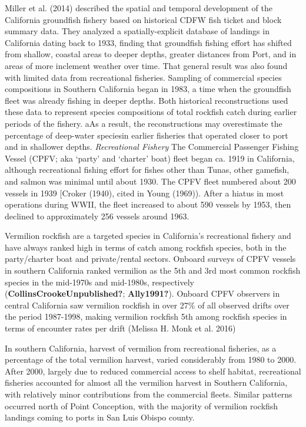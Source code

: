 \documentclass[
  english,
  a4paper,
]{article}
\begin{document}
Miller et al. (2014) described the spatial and temporal development of the
California groundfish fishery based on historical CDFW fish ticket and block summary data. They analyzed a spatially-explicit database of
landings in California dating back to 1933, finding that groundfish fishing effort
has shifted from shallow, coastal areas to deeper depths, greater distances from
Port, and in areas of more inclement weather over time. That general result was also found with limited data from recreational fisheries. Sampling of commercial species compositions in Southern California
began in 1983, a time when the groundfish fleet was already fishing in deeper depths.
Both historical reconstructions used these data to represent species compositions of
total rockfish catch during earlier periods of the fishery. aAs a result, the reconstructions may
overestimate the percentage of deep-water speciesin earlier fisheries that operated closer
to port and in shallower depths.
\emph{Recreational Fishery}
The Commercial Passenger Fishing Vessel (CPFV; aka `party' and `charter' boat)
fleet began ca. 1919 in California, although recreational fishing effort for
fishes other than Tunas, other gamefish, and salmon was minimal until about 1930. The CPFV fleet numbered about 200 vessels in 1939 {[}Croker (1940), cited in Young (1969)).
After a hiatus in most operations during WWII, the fleet increased to about 590 vessels
by 1953, then declined to approximately 256 vessels around 1963.

Vermilion rockfish are a targeted species in California's recreational fishery
and have always ranked high in terms of catch among rockfish species, both in the party/charter
boat and private/rental sectors. Onboard surveys of CPFV vessels in southern California ranked vermilion as the 5th and 3rd most common rockfish species in the mid-1970s and mid-1980s, respectively (\textbf{CollinsCrookeUnpublished?}; \textbf{Ally1991?}). Onboard CPFV observers in central California saw vermilion rockfish in over 27\% of all observed drifts over the period 1987-1998, making vermilion rockfish 5th among rockfish species in terms of encounter rates per drift (Melissa H. Monk et al. 2016)

In southern California, harvest of vermilion from recreational fisheries, as a percentage of the total vermilion harvest, varied considerably from 1980 to 2000. After 2000, largely due to reduced commercial access to shelf habitat, recreational fisheries accounted for almost all the vermilion harvest in Southern California, with relatively minor contributions from the commercial fleets. Similar patterns occurred north of Point Conception, with the majority of vermilion rockfish landings coming to ports in San Luis Obispo county.
\end{document}
